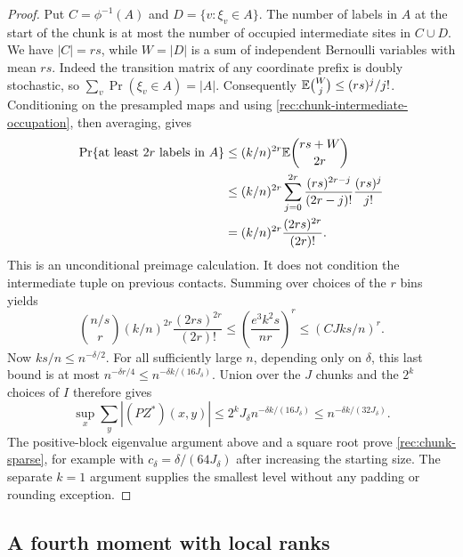 \begin{proof}
Put $C=\phi^{-1}(A)$ and $D=\{v:\xi_v\in A\}$.
The number of labels in $A$ at the start of the chunk is
at most the number of occupied intermediate sites in $C\cup D$.
We have $|C|=rs$, while $W=|D|$ is a sum of independent
Bernoulli variables with mean $rs$.  Indeed the transition
matrix of any coordinate prefix is doubly stochastic, so
$\sum_v\Pr(\xi_v\in A)=|A|$.
Consequently
$\mathbb E\binom Wj\le(rs)^j/j!$.
Conditioning on the presampled maps and using
\eqref{rec:chunk-intermediate-occupation}, then averaging,
gives
\[
 \begin{split}
 \Pr\{\text{at least $2r$ labels in }A\}
 &\le(k/n)^{2r}\mathbb E\binom{rs+W}{2r}\\
 &\le(k/n)^{2r}
       \sum_{j=0}^{2r}\frac{(rs)^{2r-j}}{(2r-j)!}
                            \frac{(rs)^j}{j!}\\
 &=(k/n)^{2r}\frac{(2rs)^{2r}}{(2r)!}.
 \end{split}
\]
This is an unconditional preimage calculation.  It does not
condition the intermediate tuple on previous contacts.
Summing over choices of the $r$ bins yields
\[
 \binom{n/s}{r}(k/n)^{2r}\frac{(2rs)^{2r}}{(2r)!}
 \le\left(\frac{e^3k^2s}{nr}\right)^r
 \le(CJks/n)^r.
\]
Now $ks/n\le n^{-\delta/2}$.  For all sufficiently large
$n$, depending only on $\delta$, this last bound is at most
$n^{-\delta r/4}\le n^{-\delta k/(16J_\delta)}$.
Union over the $J$ chunks and the $2^k$ choices of $I$
therefore gives
\[
 \sup_x\sum_y|(PZ^*)(x,y)|
 \le2^kJ_\delta n^{-\delta k/(16J_\delta)}
 \le n^{-\delta k/(32J_\delta)}.
\]
The positive-block eigenvalue argument above and a square
root prove \eqref{rec:chunk-sparse}, for example with
$c_\delta=\delta/(64J_\delta)$ after increasing the
starting size.  The separate $k=1$ argument supplies the
smallest level without any padding or rounding exception.
\end{proof}

\subsection{A fourth moment with local ranks}

